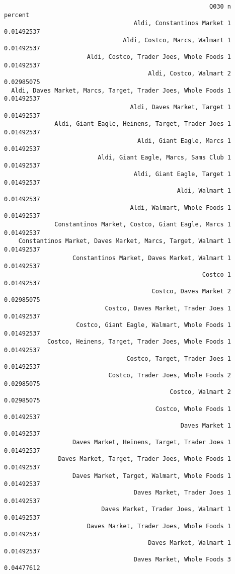 \documentclass[]{article}
\begin{document}
\begin{verbatim}
                                                         Q030 n    percent
                                    Aldi, Constantinos Market 1 0.01492537
                                 Aldi, Costco, Marcs, Walmart 1 0.01492537
                       Aldi, Costco, Trader Joes, Whole Foods 1 0.01492537
                                        Aldi, Costco, Walmart 2 0.02985075
  Aldi, Daves Market, Marcs, Target, Trader Joes, Whole Foods 1 0.01492537
                                   Aldi, Daves Market, Target 1 0.01492537
              Aldi, Giant Eagle, Heinens, Target, Trader Joes 1 0.01492537
                                     Aldi, Giant Eagle, Marcs 1 0.01492537
                          Aldi, Giant Eagle, Marcs, Sams Club 1 0.01492537
                                    Aldi, Giant Eagle, Target 1 0.01492537
                                                Aldi, Walmart 1 0.01492537
                                   Aldi, Walmart, Whole Foods 1 0.01492537
              Constantinos Market, Costco, Giant Eagle, Marcs 1 0.01492537
    Constantinos Market, Daves Market, Marcs, Target, Walmart 1 0.01492537
                   Constantinos Market, Daves Market, Walmart 1 0.01492537
                                                       Costco 1 0.01492537
                                         Costco, Daves Market 2 0.02985075
                            Costco, Daves Market, Trader Joes 1 0.01492537
                    Costco, Giant Eagle, Walmart, Whole Foods 1 0.01492537
            Costco, Heinens, Target, Trader Joes, Whole Foods 1 0.01492537
                                  Costco, Target, Trader Joes 1 0.01492537
                             Costco, Trader Joes, Whole Foods 2 0.02985075
                                              Costco, Walmart 2 0.02985075
                                          Costco, Whole Foods 1 0.01492537
                                                 Daves Market 1 0.01492537
                   Daves Market, Heinens, Target, Trader Joes 1 0.01492537
               Daves Market, Target, Trader Joes, Whole Foods 1 0.01492537
                   Daves Market, Target, Walmart, Whole Foods 1 0.01492537
                                    Daves Market, Trader Joes 1 0.01492537
                           Daves Market, Trader Joes, Walmart 1 0.01492537
                       Daves Market, Trader Joes, Whole Foods 1 0.01492537
                                        Daves Market, Walmart 1 0.01492537
                                    Daves Market, Whole Foods 3 0.04477612

\end{verbatim}
\end{document}
